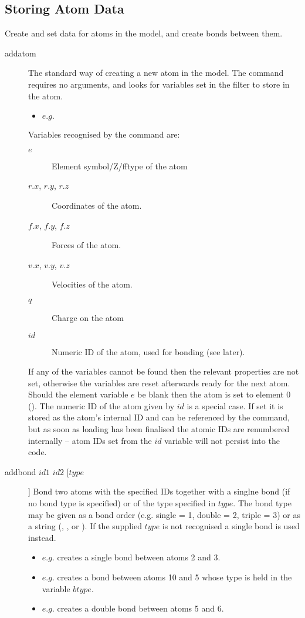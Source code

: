 \subsection{Storing Atom Data}
Create and set data for atoms in the model, and create bonds between them.\\
\begin{description}

	\item[addatom\its]
	The standard way of creating a new atom in the model. The command requires no arguments, and looks for variables set in the filter to store in the atom.
	\begin{itemize}
		\item $e.g.$ 
	\end{itemize}

	Variables recognised by the command are:
	\begin{description}
		\item[$e$\its]
			Element symbol/Z/fftype of the atom
		\item[$r.x$, $r.y$, $r.z$\its]
			Coordinates of the atom.
		\item[$f.x$, $f.y$, $f.z$\its]
			Forces of the atom.
		\item[$v.x$, $v.y$, $v.z$\its]
			Velocities of the atom.
		\item[$q$\its]
			Charge on the atom
		\item[$id$\its]
			Numeric ID of the atom, used for bonding (see later).
	\end{description}
	If any of the variables cannot be found then the relevant properties are not set, otherwise the variables are reset afterwards ready for the next atom. Should the element variable $e$ be blank then the atom is set to element 0 (). The numeric ID of the atom given by $id$ is a special case. If set it is stored as the atom's internal ID and can be referenced by the  command, but as soon as loading has been finalised the atomic IDs are renumbered internally -- atom IDs set from the $id$ variable will not persist into the code.

	\item[addbond $id1$ $id2$ [$type$]\its]
	Bond two atoms with the specified IDs together with a singlne bond (if no bond type is specified) or of the type specified in $type$. The bond type may be given as a bond order (e.g. single = 1, double = 2, triple = 3) or as a string (, , or ). If the supplied $type$ is not recognised a single bond is used instead.
	\begin{itemize}
		\item $e.g.$  creates a single bond between atoms 2 and 3.
		\item $e.g.$  creates a bond between atoms 10 and 5 whose type is held in the variable $btype$.
		\item $e.g.$  creates a double bond between atoms 5 and 6.
	\end{itemize}


\end{description}
